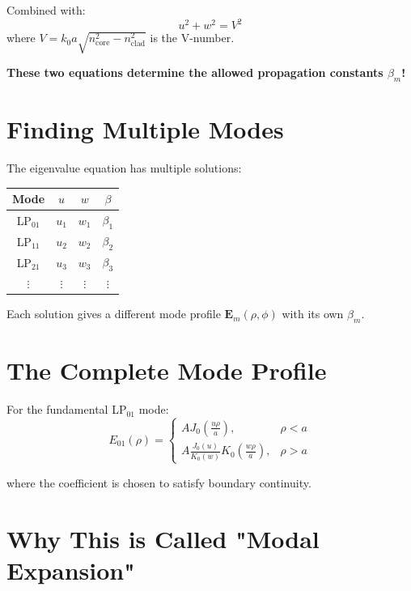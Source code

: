 \documentclass[12pt]{article}
\begin{document}
Combined with:
\begin{equation}
u^2 + w^2 = V^2
\end{equation}
where $V = k_0 a \sqrt{n_{\text{core}}^2 - n_{\text{clad}}^2}$ is the V-number.

\textbf{These two equations determine the allowed propagation constants $\beta_m$!}

\section{Finding Multiple Modes}

The eigenvalue equation has multiple solutions:

\begin{center}
\begin{tabular}{|c|c|c|c|}
\hline
\textbf{Mode} & \textbf{$u$} & \textbf{$w$} & \textbf{$\beta$} \\
\hline
LP$_{01}$ & $u_1$ & $w_1$ & $\beta_1$ \\
LP$_{11}$ & $u_2$ & $w_2$ & $\beta_2$ \\
LP$_{21}$ & $u_3$ & $w_3$ & $\beta_3$ \\
$\vdots$ & $\vdots$ & $\vdots$ & $\vdots$ \\
\hline
\end{tabular}
\end{center}

Each solution gives a different mode profile $\mathbf{E}_m(\rho, \phi)$ with its own $\beta_m$.

\section{The Complete Mode Profile}

For the fundamental LP$_{01}$ mode:
\begin{equation}
E_{01}(\rho) = 
\begin{cases}
A J_0\left(\frac{u\rho}{a}\right), & \rho < a \\[0.3cm]
A \frac{J_0(u)}{K_0(w)} K_0\left(\frac{w\rho}{a}\right), & \rho > a
\end{cases}
\end{equation}

where the coefficient is chosen to satisfy boundary continuity.

\section{Why This is Called "Modal Expansion"}
\end{document}
